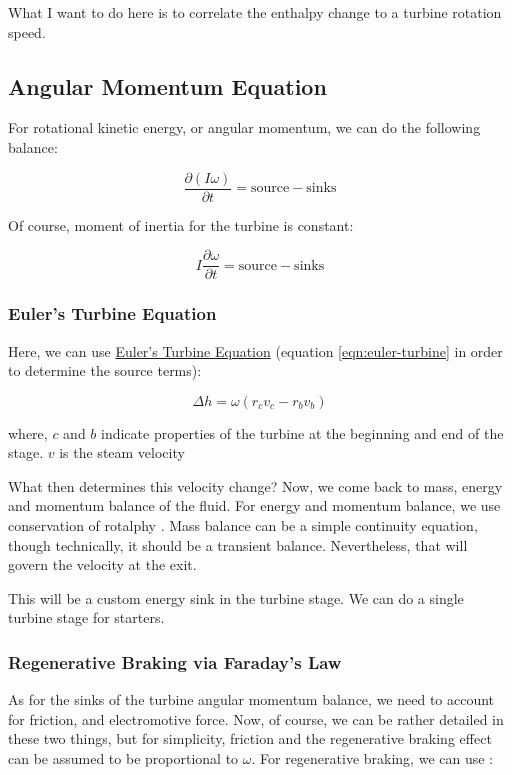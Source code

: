 \documentclass[masters]{ucbthesis}
\renewcommand{\_}{\kern-1.5pt\textunderscore\kern-1.5pt}
\begin{document}
What I want to do here is to correlate the enthalpy change to a turbine 
rotation speed.

\subsection{Angular Momentum Equation}
For rotational kinetic energy, or angular momentum, we can do the following 
balance:

\begin{equation*}
	\frac{\partial (I \omega)}{\partial t} = \text{source} - \text{sinks}
\end{equation*}

Of course, moment of inertia for the turbine is constant:

\begin{equation*}
	I \frac{\partial  \omega}{\partial t} = \text{source} - \text{sinks}
\end{equation*}

\subsubsection{Euler's Turbine Equation}
Here, we can use 
\href{https://web.mit.edu/16.unified/www/FALL/thermodynamics/notes/node91.html}{Euler's Turbine Equation}
(equation \ref{eqn:euler-turbine} in order to determine the source terms):

\begin{equation} \label{eqn:euler-turbine}
	\Delta h = \omega (r_c v_c - r_b v_b)
\end{equation}

where, $c$ and $b$ indicate properties of the turbine at the beginning 
and end of the stage. $v$ is the steam velocity

What then determines this velocity change? 
Now, we come back to mass, energy and momentum balance of the fluid. 
For energy and momentum balance, we use conservation of rotalphy 
\citep{agromayor2019preliminary}. Mass balance can be a simple continuity 
equation, though technically, it should be a transient balance.
Nevertheless, that will govern the velocity at the exit.

This will be a custom energy sink in the turbine stage. We can do 
a single turbine stage for starters.

\subsubsection{Regenerative Braking via Faraday's Law}
As for the sinks of the turbine angular momentum balance, we need 
to account for friction, and electromotive force. Now, of course, 
we can be rather detailed in these two things, but for simplicity, friction 
and the regenerative braking effect can be assumed to be proportional to  
$\omega$. For regenerative braking, we can use \citep{zhang2022research}:
\end{document}
